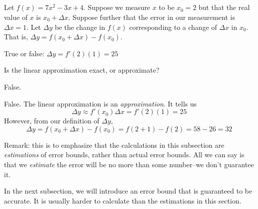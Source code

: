 %
%



\subsection*{\Conceptual}

\begin{question}
Let $f(x)=7x^2-3x+4$.
Suppose we measure $x$ to be $x_0 = 2$
        but that the real value of $x$ is $x_0+\Delta x$. Suppose further that
        the error in our measurement is $\Delta x = 1$.
Let $\Delta y$ be the change in $f(x)$ corresponding to a change of $\Delta x $ in $x_0$. That is,
$\Delta y = f\left(x_0+\Delta x\right)-f(x_0)$.

True or false: $\Delta y = f'(2)(1)=25$
\end{question}
\begin{hint}
Is the linear approximation exact, or approximate?
\end{hint}
\begin{answer} False.
\end{answer}
\begin{solution}
False. The linear approximation is an \emph{approximation}. It tells us
\[\Delta  y \approx  f'(x_0)\Delta x=f'(2)(1)=25\]
However, from our definition of $\Delta y$,
\[\Delta y = f(x_0+\Delta x)-f(x_0)=f(2+1)-f(2)=58-26=32\]

Remark: this is to emphasize that the calculations in this subsection are \emph{estimations} of error bounds, rather than actual error bounds. All we can say is that we \emph{estimate} the error will be no more than some number--we don't guarantee it.

In the next subsection, we will introduce an error bound that is guaranteed to be accurate. It is usually harder to calculate than the estimations in this section.
\end{solution}





